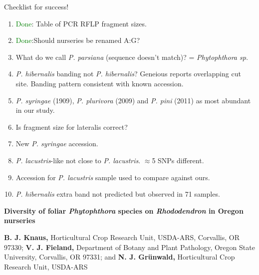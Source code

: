 \documentclass[12pt]{article}
\date{}
\begin{document}

Checklist for success!

\begin{enumerate}
  \item \textcolor{green}{Done}: Table of PCR RFLP fragment sizes.
  \item \textcolor{green}{Done}:Should nurseries be renamed A:G?


  \item What do we call \emph{P. parsiana} (sequence doesn't match)? = \emph{Phytophthora sp.}
  \item \emph{P. hibernalis} banding not \emph{P. hibernalis}? Geneious reports overlapping cut site. Banding pattern consistent with known accession.

  \item \emph{P. syringae} (1909), \emph{P. plurivora} (2009) and \emph{P. pini} (2011) as most abundant in our study.
  \item Is fragment size for lateralis correct?
  \item New \emph{P. syringae} accession.
  \item \emph{P. lacustris}-like not close to \emph{P. lacustris}. $\approx$5 SNPs different.
  \item Accession for \emph{P. lacustris} sample used to compare against ours.
  \item \emph{P. hibernalis} extra band not predicted but observed in 71 samples.


\end{enumerate}

\newpage


\begin{flushleft}
{\large
\textbf{Diversity of foliar \textit{Phytophthora} species on \textit{Rhododendron} in Oregon nurseries}
}
\\

\hspace{12pt}

\textbf{B. J. Knaus,} Horticultural Crop Research Unit, USDA-ARS, Corvallis, OR 97330; \textbf{V. J. Fieland,} Department of Botany and Plant Pathology, Oregon State University, Corvallis, OR 97331; and \textbf{N. J. Gr\"{u}nwald,} Horticultural Crop Research Unit, USDA-ARS\\

\end{flushleft}
\end{document}
